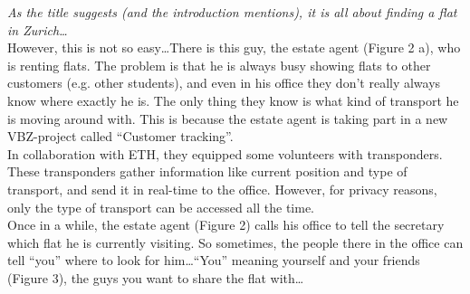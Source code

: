 \emph{As the title suggests (and the introduction mentions), it is all about finding a flat in Zurich\ldots}\\

However, this is not so easy\ldots There is this guy, the estate agent (Figure 2 a), who is renting flats. The problem is that he is always busy showing flats to other customers (e.g. other students), and even in his office they don't really always know where exactly he is. The only thing they know is what kind of transport he is moving around with. This is because the estate agent is taking part in a new VBZ-project called ``Customer tracking''.\\

In collaboration with ETH, they equipped some volunteers with transponders. These transponders gather information like current position and type of transport, and send it in real-time to the office. However, for privacy reasons, only the type of transport can be accessed all the time.\\

Once in a while, the estate agent (Figure 2) calls his office to tell the secretary which flat he is currently visiting. So sometimes, the people there in the office can tell ``you'' where to look for him\ldots ``You'' meaning yourself and your friends (Figure 3), the guys you want to share the flat with\ldots 

